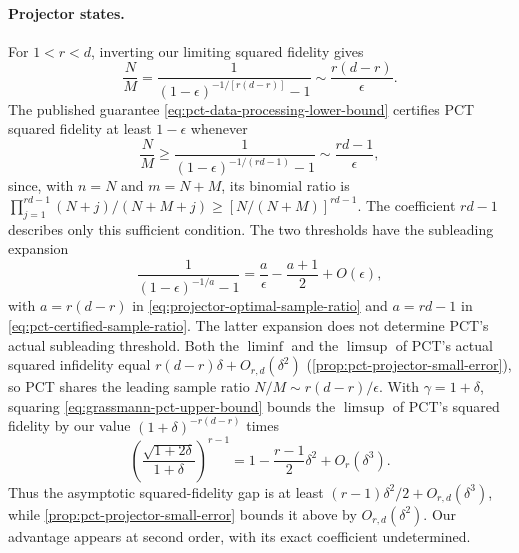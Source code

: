 \documentclass[11pt]{article}
\theoremstyle{remark}
\theoremstyle{plain}
\begin{document}
\paragraph{Projector states.}
For \(1<r<d\), inverting our limiting squared fidelity gives
\begin{equation}\label{eq:projector-optimal-sample-ratio}
  \frac{N}{M}
  =\frac{1}{(1-\epsilon)^{-1/[r(d-r)]}-1}
  \sim\frac{r(d-r)}{\epsilon}.
\end{equation}
The published guarantee \eqref{eq:pct-data-processing-lower-bound} certifies
PCT squared fidelity at least \(1-\epsilon\) whenever
\begin{equation}\label{eq:pct-certified-sample-ratio}
  \frac{N}{M}
  \ge\frac{1}{(1-\epsilon)^{-1/(rd-1)}-1}
  \sim\frac{rd-1}{\epsilon},
\end{equation}
since, with \(n=N\) and \(m=N+M\), its binomial ratio is
\(\prod_{j=1}^{rd-1}(N+j)/(N+M+j)\ge[N/(N+M)]^{rd-1}\).
The coefficient \(rd-1\) describes only this sufficient condition.
The two thresholds have the subleading expansion
\begin{equation}\label{eq:power-fidelity-threshold-expansion}
  \frac1{(1-\epsilon)^{-1/a}-1}
  =\frac a\epsilon-\frac{a+1}{2}+O(\epsilon),
\end{equation}
with \(a=r(d-r)\) in \eqref{eq:projector-optimal-sample-ratio} and
\(a=rd-1\) in \eqref{eq:pct-certified-sample-ratio}.  The latter expansion
does not determine PCT's actual subleading threshold.
Both the \(\liminf\) and the \(\limsup\) of PCT's actual squared
infidelity equal \(r(d-r)\delta+O_{r,d}(\delta^2)\)
(\cref{prop:pct-projector-small-error}), so PCT shares the leading sample
ratio \(N/M\sim r(d-r)/\epsilon\).  With \(\gamma=1+\delta\), squaring
\eqref{eq:grassmann-pct-upper-bound} bounds the \(\limsup\) of PCT's
squared fidelity by our value \((1+\delta)^{-r(d-r)}\) times
\[
  \left(\frac{\sqrt{1+2\delta}}{1+\delta}\right)^{r-1}
  =1-\frac{r-1}{2}\delta^2+O_r(\delta^3).
\]
Thus the asymptotic squared-fidelity gap is at least
\((r-1)\delta^2/2+O_{r,d}(\delta^3)\), while
\cref{prop:pct-projector-small-error} bounds it above by
\(O_{r,d}(\delta^2)\).  Our advantage appears at second order,
with its exact coefficient undetermined.
\end{document}
